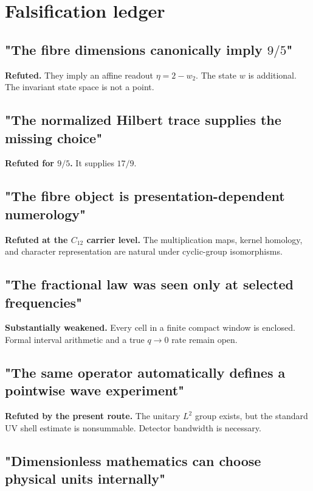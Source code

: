 \documentclass[11pt,a4paper,openany]{report}
\begin{document}
\section{Falsification ledger}

\subsection{\texorpdfstring{"The fibre dimensions canonically imply \(9/5\)"}{"The fibre dimensions canonically imply 9/\allowbreak{}5"}}

\textbf{Refuted.} They imply an affine readout \(\eta=2-w_2\). The state \(w\) is additional. The invariant state space is not a point.

\subsection{"The normalized Hilbert trace supplies the missing choice"}

\textbf{Refuted for \(9/5\).} It supplies \(17/9\).

\subsection{"The fibre object is presentation-dependent numerology"}

\textbf{Refuted at the \(C_{12}\) carrier level.} The multiplication maps, kernel homology, and character representation are natural under cyclic-group isomorphisms.

\subsection{"The fractional law was seen only at selected frequencies"}

\textbf{Substantially weakened.} Every cell in a finite compact window is enclosed. Formal interval arithmetic and a true \(q\to0\) rate remain open.

\subsection{"The same operator automatically defines a pointwise wave experiment"}

\textbf{Refuted by the present route.} The unitary \(L^2\) group exists, but the standard UV shell estimate is nonsummable. Detector bandwidth is necessary.

\subsection{"Dimensionless mathematics can choose physical units internally"}
\end{document}
